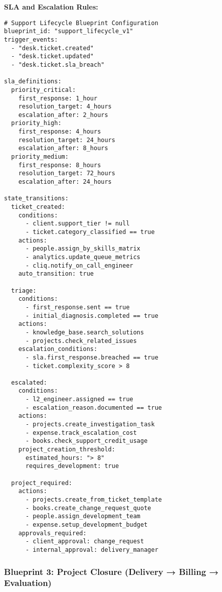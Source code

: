 \textbf{SLA and Escalation Rules:}
\begin{verbatim}
# Support Lifecycle Blueprint Configuration
blueprint_id: "support_lifecycle_v1"
trigger_events:
  - "desk.ticket.created"
  - "desk.ticket.updated"
  - "desk.ticket.sla_breach"

sla_definitions:
  priority_critical:
    first_response: 1_hour
    resolution_target: 4_hours
    escalation_after: 2_hours
  priority_high:
    first_response: 4_hours
    resolution_target: 24_hours
    escalation_after: 8_hours
  priority_medium:
    first_response: 8_hours
    resolution_target: 72_hours
    escalation_after: 24_hours

state_transitions:
  ticket_created:
    conditions:
      - client.support_tier != null
      - ticket.category_classified == true
    actions:
      - people.assign_by_skills_matrix
      - analytics.update_queue_metrics
      - cliq.notify_on_call_engineer
    auto_transition: true
    
  triage:
    conditions:
      - first_response.sent == true
      - initial_diagnosis.completed == true
    actions:
      - knowledge_base.search_solutions
      - projects.check_related_issues
    escalation_conditions:
      - sla.first_response.breached == true
      - ticket.complexity_score > 8
      
  escalated:
    conditions:
      - l2_engineer.assigned == true
      - escalation_reason.documented == true
    actions:
      - projects.create_investigation_task
      - expense.track_escalation_cost
      - books.check_support_credit_usage
    project_creation_threshold:
      estimated_hours: "> 8"
      requires_development: true
      
  project_required:
    actions:
      - projects.create_from_ticket_template
      - books.create_change_request_quote
      - people.assign_development_team
      - expense.setup_development_budget
    approvals_required:
      - client_approval: change_request
      - internal_approval: delivery_manager
\end{verbatim}

\subsubsection{Blueprint 3: Project Closure (Delivery → Billing → Evaluation)}

